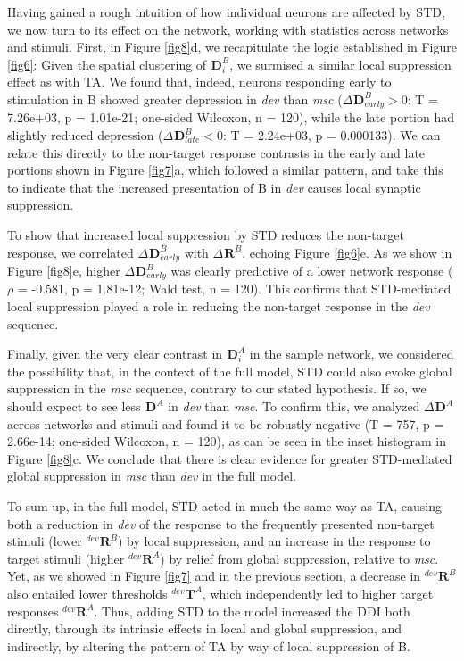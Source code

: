 \documentclass[pdflatex,referee,iicol,sn-basic]{sn-jnl}
\newcommand{\dev}{\textit{dev}}
\newcommand{\msc}{\textit{msc}}
\renewcommand{\R}[3][]{{}^{#1}_{}\mathbf{R}^{#2}_{#3}}
\renewcommand{\T}[3][]{{}^{#1}_{}\mathbf{T}^{#2}_{#3}}
\newcommand{\D}[3][]{{}^{#1}_{}\mathbf{D}^{#2}_{#3}}
\newcommand{\reffig}[1]{Figure \ref{fig#1}}
\newcommand{\refpanel}[2]{Figure \ref{fig#1}\lowercase{#2}}
\begin{document}
Having gained a rough intuition of how individual neurons are affected by STD, we now turn to its effect on the network, working with statistics across networks and stimuli. First, in \refpanel{8}{d}, we recapitulate the logic established in \reffig{6}: Given the spatial clustering of $\D{B}{i}$, we surmised a similar local suppression effect as with TA. We found that, indeed, neurons responding early to stimulation in B showed greater depression in \dev{} than \msc{} ($\Delta \D{B}{early} > 0$: T = 7.26e+03, p = 1.01e-21; one-sided Wilcoxon, n = 120), while the late portion had slightly reduced depression ($\Delta \D{B}{late} < 0$: T = 2.24e+03, p = 0.000133). We can relate this directly to the non-target response contrasts in the early and late portions shown in \refpanel{7}{a}, which followed a similar pattern, and take this to indicate that the increased presentation of B in \dev{} causes local synaptic suppression. %

To show that increased local suppression by STD reduces the non-target response, we correlated $\Delta \D{B}{early}$ with $\Delta \R{B}{}$, echoing \refpanel{6}{e}. As we show in \refpanel{8}{e}, higher $\Delta \D{B}{early}$ was clearly predictive of a lower network response ($\rho$ = -0.581, p = 1.81e-12; Wald test, n = 120). This confirms that STD-mediated local suppression played a role in reducing the non-target response in the \dev{} sequence.

Finally, given the very clear contrast in $\D{A}{i}$ in the sample network, we considered the possibility that, in the context of the full model, STD could also evoke global suppression in the \msc{} sequence, contrary to our stated hypothesis. If so, we should expect to see less $\D{A}{}$ in \dev{} than \msc{}. To confirm this, we analyzed $\Delta \D{A}{}$ across networks and stimuli and found it to be robustly negative (T = 757, p = 2.66e-14; one-sided Wilcoxon, n = 120), as can be seen in the inset histogram in \refpanel{8}{c}. We conclude that there is clear evidence for greater STD-mediated global suppression in \msc{} than \dev{} in the full model.

To sum up, in the full model, STD acted in much the same way as TA, causing both a reduction in \dev{} of the response to the frequently presented non-target stimuli (lower $\R[dev]{B}{}$) by local suppression, and an increase in the response to target stimuli (higher $\R[dev]{A}{}$) by relief from global suppression, relative to \msc{}. Yet, as we showed in \reffig{7} and in the previous section, a decrease in $\R[dev]{B}{}$ also entailed lower thresholds $\T[dev]{A}{}$, which independently led to higher target responses $\R[dev]{A}{}$. Thus, adding STD to the model increased the DDI both directly, through its intrinsic effects in local and global suppression, and indirectly, by altering the pattern of TA by way of local suppression of B.
\end{document}
